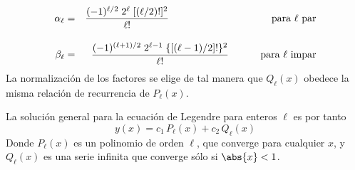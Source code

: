 \begin{align}
\alpha_{\ell} &=& \dfrac{(-1)^{\ell/2} \; 2^{\ell} \; [(\ell / 2)!]^{2}}{\ell!} \hspace{3.5cm} \text{ para $\ell$ par} \label{eq:ecuacion_18_05}\\[1em]
\beta_{\ell} &=& \dfrac{(-1)^{(\ell + 1)/2} \; 2^{\ell - 1} \; \lbrace \left[ (\ell - 1) /2 \right] ! \rbrace^{2}}{\ell!} \hspace{1cm} \text{ para $\ell$ impar} \label{eq:ecuacion_18_06}
\end{align}
La normalización de los factores se elige de tal manera que $Q_{\ell}(x)$ obedece la misma relación de recurrencia de $P_{\ell}(x)$.
\par
La solución general para la ecuación de Legendre para enteros $\ell$ es por tanto
\begin{equation}
y(x) = c_{1} \, P_{\ell}(x) + c_{2} \, Q_{\ell} (x) 
\label{eq:ecuacion_18_07}
\end{equation}
Donde $P_{\ell}(x)$ es un polinomio de orden $\ell$, que converge para cualquier $x$, y $Q_{\ell}(x)$ es una serie infinita que converge sólo si $\abs{x} < 1$.
